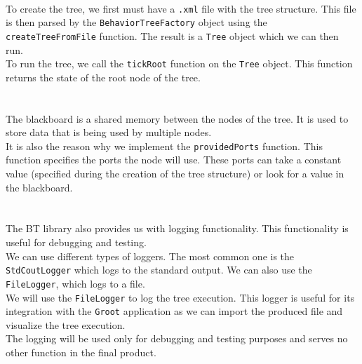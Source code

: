         \\
            To create the tree, we first must have a \texttt{.xml} file with the tree structure. This file is then parsed by the \texttt{BehaviorTreeFactory} object using the \texttt{createTreeFromFile} function. The result is a \texttt{Tree} object which we can then run.\\
            To run the tree, we call the \texttt{tickRoot} function on the \texttt{Tree} object. This function returns the state of the root node of the tree.\\\\
        \\
            The blackboard is a shared memory between the nodes of the tree. It is used to store data that is being used by multiple nodes.\\
            It is also the reason why we implement the \texttt{providedPorts} function. This function specifies the ports the node will use. These ports can take a constant value (specified during the creation of the tree structure) or look for a value in the blackboard.\\\\
        \\
            The BT library also provides us with logging functionality. This functionality is useful for debugging and testing.\\
            We can use different types of loggers. The most common one is the \texttt{StdCoutLogger} which logs to the standard output. We can also use the \texttt{FileLogger}, which logs to a file.\\
            We will use the \texttt{FileLogger} to log the tree execution. This logger is useful for its integration with the \texttt{Groot} application as we can import the produced file and visualize the tree execution.\\
            The logging will be used only for debugging and testing purposes and serves no other function in the final product.
    
    
    
    